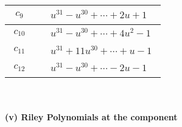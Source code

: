 \documentclass[1p]{elsarticle_modified}
\theoremstyle{definition}
\begin{document}
\begin{tabular}{m{50pt}|m{274pt}}
\hline $$\begin{aligned}c_{9}\end{aligned}$$&$\begin{aligned}
&u^{31}- u^{30}+\cdots+2 u+1
\end{aligned}$\\
\hline $$\begin{aligned}c_{10}\end{aligned}$$&$\begin{aligned}
&u^{31}- u^{30}+\cdots+4 u^2-1
\end{aligned}$\\
\hline $$\begin{aligned}c_{11}\end{aligned}$$&$\begin{aligned}
&u^{31}+11 u^{30}+\cdots+u-1
\end{aligned}$\\
\hline $$\begin{aligned}c_{12}\end{aligned}$$&$\begin{aligned}
&u^{31}- u^{30}+\cdots-2 u-1
\end{aligned}$\\
\hline
\end{tabular}\\~\\
\newpage\renewcommand{\arraystretch}{1}
\flushleft \textbf{(v) Riley Polynomials at the component}\newline \\
\end{document}
